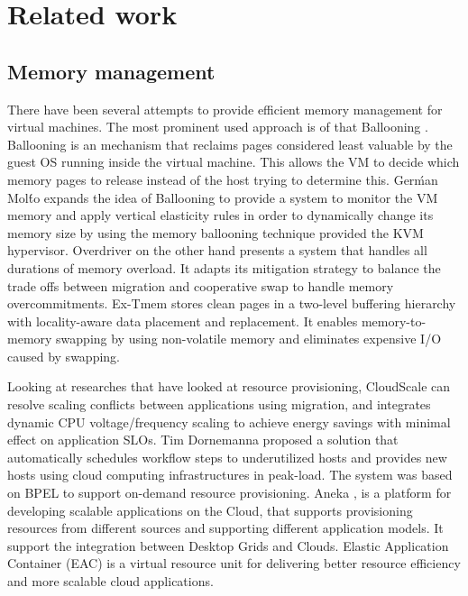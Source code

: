 
\chapter{Related work}

  \section{Memory management}
  
  There have been several attempts to provide efficient memory management for virtual machines. The most prominent used approach is of 
that Ballooning \cite{waldspurger2002memory}. Ballooning is an mechanism that reclaims pages considered least valuable by the guest OS 
running inside the virtual machine. This allows the VM to decide which memory pages to release instead of the host trying to determine this.
Gerḿan Molt́o \cite{molto2013elastic} expands the idea of Ballooning to provide a system to monitor the VM memory and apply vertical 
elasticity rules in order to dynamically change its memory size by using the memory ballooning technique provided the KVM hypervisor. 
Overdriver \cite{williams2011overdriver} on the other hand presents a system that handles all durations of memory overload. It adapts its 
mitigation strategy to balance the trade offs between migration and cooperative swap to handle memory overcommitments. Ex-Tmem 
\cite{venkatesan2014ex} stores clean pages in a two-level buffering hierarchy with locality-aware data placement and replacement. It 
enables memory-to-memory swapping by using non-volatile memory and eliminates expensive I/O caused by swapping.
  
  Looking at researches that have looked at resource provisioning, CloudScale \cite{shen2011cloudscale} can resolve scaling conflicts 
between applications using migration, and integrates dynamic CPU voltage/frequency scaling to achieve energy savings with minimal effect on 
application SLOs. Tim Dornemanna\cite{dornemann2009demand} proposed a solution that automatically schedules workflow steps to underutilized 
hosts and provides new hosts using cloud computing infrastructures in peak-load. The system was based on BPEL to support on-demand resource 
provisioning. Aneka \cite{calheiros2012aneka}, is a platform for developing scalable applications on the Cloud, that supports provisioning 
resources from different sources and supporting different application models. It support the integration between Desktop Grids and Clouds. 
Elastic Application Container (EAC) \cite{he2012elastic} is a virtual resource unit for delivering better resource efficiency and more 
scalable cloud applications. 

